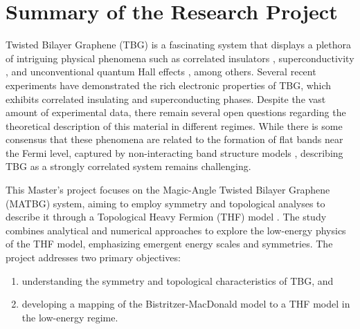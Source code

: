 \documentclass[12pt]{report}
\begin{document}
%
%
\geraTitulo
%
\folhaDeRosto
%
%
%
\tableofcontents
\thispagestyle{empty}
\clearpage
%

\sectionfont{\scshape}



\chapter{Summary of the Research Project} \label{chp:abstract}

Twisted Bilayer Graphene (TBG) is a fascinating system that displays a plethora of intriguing physical phenomena such as correlated insulators \cite{cao2018_correlated}, superconductivity \cite{cao2018}, and unconventional quantum Hall effects \cite{unconv_QHE_tbg_2006}, among others. Several recent experiments have demonstrated the rich electronic properties of TBG, which exhibits correlated insulating and superconducting phases. Despite the vast amount of experimental data, there remain several open questions regarding the theoretical description of this material in different regimes. While there is some consensus that these phenomena are related to the formation of flat bands near the Fermi level, captured by non-interacting band structure models \cite{macdonald2011}, describing TBG as a strongly correlated system remains challenging.

This Master's project focuses on the Magic-Angle Twisted Bilayer Graphene (MATBG) system, aiming to employ symmetry and topological analyses to describe it through a Topological Heavy Fermion (THF) model \cite{topoheavyfermion2022}. The study combines analytical and numerical approaches to explore the low-energy physics of the THF model, emphasizing emergent energy scales and symmetries. The project addresses two primary objectives:
\begin{enumerate}[label=(\alph*)]
\item understanding the symmetry and topological characteristics of TBG, and
\item developing a mapping of the Bistritzer-MacDonald model to a THF model in the low-energy regime.
\end{enumerate}
\end{document}
